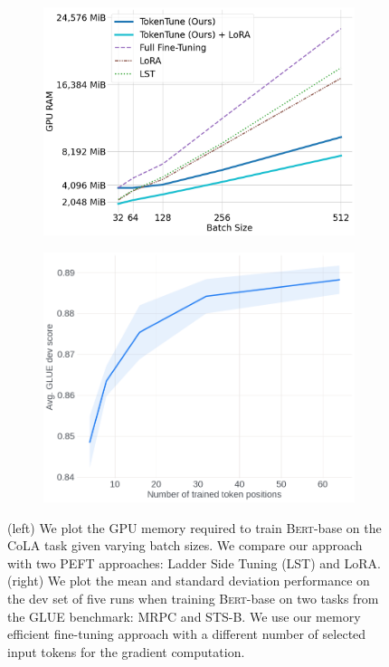 








\begin{figure}[t]
     \centering
     \hspace*{\fill}\begin{subfigure}[b]{.44\linewidth}
         \centering
         \includegraphics[width=\linewidth]{figures/bs_7.png}
\label{fig:ram}
     \end{subfigure}
     \hfill
     \begin{subfigure}[b]{.44\linewidth}
         \centering
         \includegraphics[width=\linewidth]{figures/pl_4.png}
\label{fig:prefix length}
     \end{subfigure}
     \hspace*{\fill}\caption{(left) We plot the GPU memory required to train \textsc{Bert}-base on the CoLA task given varying batch sizes. We compare our approach with two PEFT approaches: Ladder Side Tuning (LST) and LoRA. 
    (right) We plot the  mean and standard deviation performance on the dev set of five runs when training \textsc{Bert}-base on two tasks from the GLUE benchmark: MRPC and STS-B. We use our memory efficient fine-tuning approach with a different number of selected input tokens for the gradient computation.}
    \label{fig:graphs}
\end{figure}

